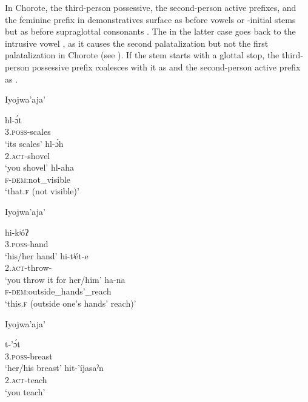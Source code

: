 In Chorote, the third-person possessive, the second-person active prefixes, and the feminine prefix in demonstratives surface as  before vowels or \mbox{-}initial stems  but as  before supraglottal consonants . The  in the latter case goes back to the intrusive vowel , as it causes the second palatalization but not the first palatalization in Chorote (see ). If the stem starts with a glottal stop, the third-person possessive prefix coalesces with it as  and the second-person active prefix as  .

\ea\label{ex:sylllh:1:ijw}
    Iyojwa’aja’ \citep[132, 161, 169]{ND09}
    \begin{xlist}
        \ex\gll hl-ɔ́t\\
                3.{\textsc{poss}}-scales\\
                \glt `its scales'
        \ex\gll hl-ɔ́h \\
                2.{\textsc{act}}-shovel \\
                \glt `you shovel'
        \ex\gll hl-aha \\
                {\textsc{f}}-{\textsc{dem}}:not\_visible \\
                \glt `that.\textsc{f} (not visible)'
    \end{xlist}
\z

\ea\label{ex:sylllh:2:ijw}
    Iyojwa’aja’ \citep[113, 122, 169]{ND09}
    \begin{xlist}
        \ex\gll hi-kʲóʔ \\
                3.{\textsc{poss}}-hand \\
                \glt `his/her hand'
        \ex\gll hi-tʲét-e \\
                2.{\textsc{act}}-throw-\APPL \\
                \glt `you throw it for her/him'
        \ex\gll ha-na \\
                {\textsc{f}}-{\textsc{dem}}:outside\_hands'\_reach \\
                \glt `this.\textsc{f} (outside one’s hands’ reach)'
    \end{xlist}
\z

\ea\label{ex:sylllh:3:ijw}
    Iyojwa’aja’ \citep[156]{ND09}
    \begin{xlist}
        \ex\gll t-’ɔ́t\\
                3.{\textsc{poss}}-breast\\
                \glt `her/his breast'
        \ex\gll hit-’íjasaˀn\\
                2.{\textsc{act}}-teach\\
                \glt `you teach'
    \end{xlist}
\z

